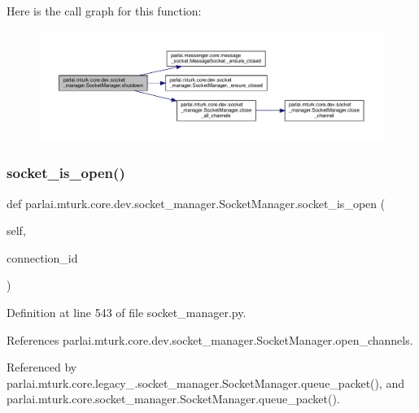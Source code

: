 Here is the call graph for this function\+:
\nopagebreak
\begin{figure}[H]
\begin{center}
\leavevmode
\includegraphics[width=350pt]{classparlai_1_1mturk_1_1core_1_1dev_1_1socket__manager_1_1SocketManager_a708d0e46408b9a7259903f8896d1902b_cgraph}
\end{center}
\end{figure}
\mbox{\label{classparlai_1_1mturk_1_1core_1_1dev_1_1socket__manager_1_1SocketManager_a2f0680695682a1bf6824efe6626d9dc6}} 
\subsubsection{\texorpdfstring{socket\+\_\+is\+\_\+open()}{socket\_is\_open()}}
{\footnotesize\ttfamily def parlai.\+mturk.\+core.\+dev.\+socket\+\_\+manager.\+Socket\+Manager.\+socket\+\_\+is\+\_\+open (\begin{DoxyParamCaption}\item[{}]{self,  }\item[{}]{connection\+\_\+id }\end{DoxyParamCaption})}



Definition at line 543 of file socket\+\_\+manager.\+py.



References parlai.\+mturk.\+core.\+dev.\+socket\+\_\+manager.\+Socket\+Manager.\+open\+\_\+channels.



Referenced by parlai.\+mturk.\+core.\+legacy\+\_.\+socket\+\_\+manager.\+Socket\+Manager.\+queue\+\_\+packet(), and parlai.\+mturk.\+core.\+socket\+\_\+manager.\+Socket\+Manager.\+queue\+\_\+packet().

